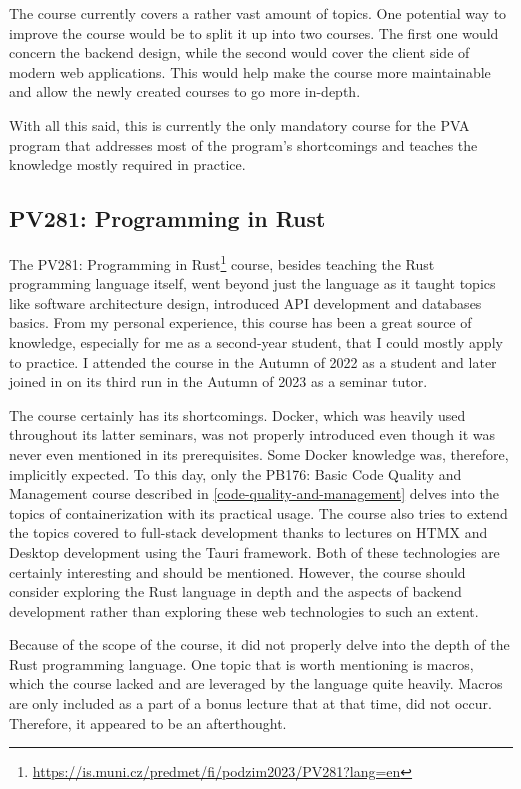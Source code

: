 \documentclass[
  digital,
  color,
  oneside,
  nosansbold,
  nocolorbold,
  nolof,
  nolot,
]{fithesis4}
\begin{document}
The course currently covers a rather vast amount of topics. One potential way to improve the course would be to split it up into two courses. The first one would concern the backend design, while the second would cover the client side of modern web applications. This would help make the course more maintainable and allow the newly created courses to go more in-depth.

With all this said, this is currently the only mandatory course for the PVA program that addresses most of the program's shortcomings and teaches the knowledge mostly required in practice.

\subsection{PV281: Programming in Rust}\label{rust-course}

The PV281: Programming in Rust\footnote{\url{https://is.muni.cz/predmet/fi/podzim2023/PV281?lang=en}} course, besides teaching the Rust programming language itself, went beyond just the language as it taught topics like software architecture design, introduced API development and databases basics. From my personal experience, this course has been a great source of knowledge, especially for me as a second-year student, that I could mostly apply to practice. I attended the course in the Autumn of 2022 as a student and later joined in on its third run in the Autumn of 2023 as a seminar tutor.

The course certainly has its shortcomings. Docker\cite{docker}, which was heavily used throughout its latter seminars, was not properly introduced even though it was never even mentioned in its prerequisites. Some Docker knowledge was, therefore, implicitly expected. To this day, only the PB176: Basic Code Quality and Management course described in \cref{code-quality-and-management} delves into the topics of containerization with its practical usage. The course also tries to extend the topics covered to full-stack development thanks to lectures on HTMX\cite{bigskysoftware-htmx} and Desktop development using the Tauri framework\cite{tauri-apps-tauri}. Both of these technologies are certainly interesting and should be mentioned. However, the course should consider exploring the Rust language in depth and the aspects of backend development rather than exploring these web technologies to such an extent.

Because of the scope of the course, it did not properly delve into the depth of the Rust programming language. One topic that is worth mentioning is macros, which the course lacked and are leveraged by the language quite heavily. Macros are only included as a part of a bonus lecture that at that time, did not occur. Therefore, it appeared to be an afterthought.
\end{document}

